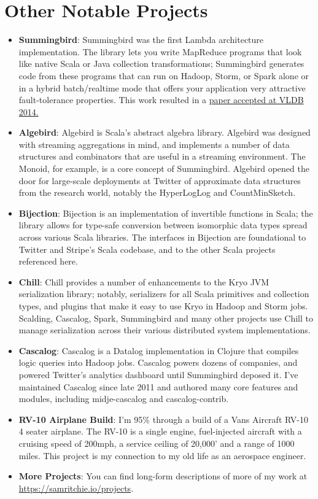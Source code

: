 \documentclass[letterpaper,11pt]{article}
\newcommand{\resumeItem}[2]{\item\small{
    \textbf{#1}{: #2 \vspace{-2pt}}
  }
}
\newcommand{\resumeSubItem}[2]{\resumeItem{#1}{#2}\vspace{-4pt}}
\newcommand{\resumeSubHeadingListStart}{\begin{itemize}[leftmargin=*]}
\newcommand{\resumeSubHeadingListEnd}{\end{itemize}}
\begin{document}
\section{Other Notable Projects}
\resumeSubHeadingListStart{}
\resumeSubItem{Summingbird}{
  Summingbird was the first Lambda architecture implementation. The library lets you write MapReduce programs that look like native Scala or Java collection transformations; Summingbird generates code from these programs that can run on Hadoop, Storm, or Spark alone or in a hybrid batch/realtime mode that offers your application very attractive fault-tolerance properties. This work resulted in a \href{http://www.vldb.org/pvldb/vol7/p1441-boykin.pdf}{paper accepted at VLDB 2014.}}
\resumeSubItem{Algebird}{
  Algebird is Scala's abstract algebra library. Algebird was designed with streaming aggregations in mind, and implements a number of data structures and combinators that are useful in a streaming environment. The Monoid, for example, is a core concept of Summingbird. Algebird opened the door for large-scale deployments at Twitter of approximate data structures from the research world, notably the HyperLogLog and CountMinSketch.}
\resumeSubItem{Bijection}{
  Bijection is an implementation of invertible functions in Scala; the library allows for type-safe conversion between isomorphic data types spread across various Scala libraries. The interfaces in Bijection are foundational to Twitter and Stripe's Scala codebase, and to the other Scala projects referenced here.}
\resumeSubItem{Chill}{
  Chill provides a number of enhancements to the Kryo JVM serialization library; notably, serializers for all Scala primitives and collection types, and plugins that make it easy to use Kryo in Hadoop and Storm jobs. Scalding, Cascalog, Spark, Summingbird and many other projects use Chill to manage serialization across their various distributed system implementations.}
\resumeSubItem{Cascalog}{
Cascalog is a Datalog implementation in Clojure that compiles logic queries into Hadoop jobs. Cascalog powers dozens of companies, and powered Twitter's analytics dashboard until Summingbird deposed it. I've maintained Cascalog since late 2011 and authored many core features and modules, including midje-cascalog and cascalog-contrib.}

\resumeSubItem{RV-10 Airplane Build}{
  I'm 95\% through a build of a Vans Aircraft RV-10 4 seater airplane. The RV-10 is a single engine, fuel-injected aircraft with a cruising speed of 200mph, a service ceiling of 20,000' and a range of 1000 miles. This project is my connection to my old life as an aerospace engineer.}
\resumeSubItem{More Projects}{
  You can find long-form descriptions of more of my work at \href{https://samritchie.io/projects/}{https://samritchie.io/projects}.
}
\resumeSubHeadingListEnd{}
\end{document}
